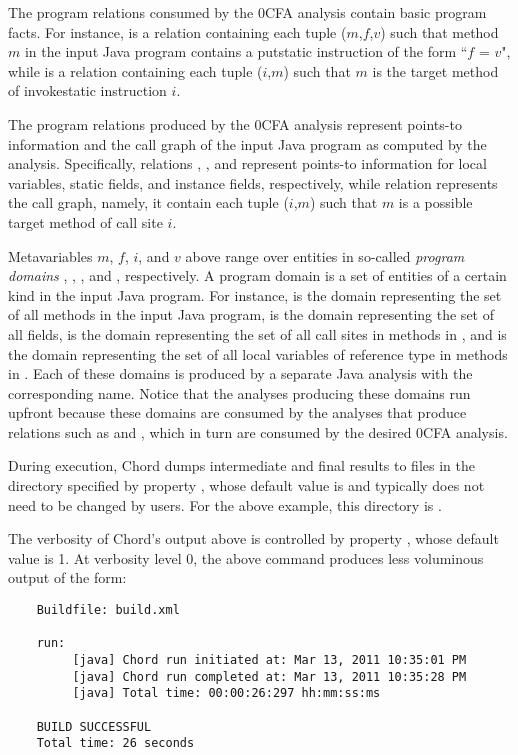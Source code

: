 The program relations consumed by the 0CFA analysis contain basic program facts.  For instance,
 is a relation containing each tuple ($m$,$f$,$v$) such that method $m$ in the input Java
program contains a putstatic instruction of the form ``$f$ = $v$", while  is a relation
containing each tuple ($i$,$m$) such that $m$ is the target method of invokestatic instruction $i$.

The program relations produced by the 0CFA analysis represent points-to information and the
call graph of the input Java program as computed by the analysis.
Specifically, relations , , and  represent points-to information 
for local variables, static fields, and instance fields, respectively,
while relation  represents the call graph, namely, it contain each tuple ($i$,$m$) such that
$m$ is a possible target method of call site $i$.

Metavariables $m$, $f$, $i$, and $v$ above range over entities in so-called {\it program domains} ,
, , and , respectively.
A program domain is a set of entities of a certain kind in the input Java program.  For instance,
 is the domain representing
the set of all methods in the input Java program,  is the domain representing the set of all fields,
 is the domain representing
the set of all call sites in methods in , and  is the domain representing the set of all local variables of reference type in methods in .
Each of these domains is produced by a separate Java analysis with the corresponding name.
Notice that the analyses producing these domains run upfront because these domains
are consumed by the analyses that produce relations such as  and
, which in turn are consumed by the desired 0CFA analysis.

During execution, Chord dumps intermediate and final results to files in the
directory specified by property , whose default value is 
and typically does not need to be changed by users.
For the above example, this directory is {\tt <PROGRAM DIR>}.

The verbosity of Chord's output above is controlled by property , whose
default value is 1.  At verbosity level 0, the above command produces less voluminous output
of the form:

\begin{verbatim}
    Buildfile: build.xml
    
    run:
         [java] Chord run initiated at: Mar 13, 2011 10:35:01 PM
         [java] Chord run completed at: Mar 13, 2011 10:35:28 PM
         [java] Total time: 00:00:26:297 hh:mm:ss:ms

    BUILD SUCCESSFUL
    Total time: 26 seconds
\end{verbatim}
